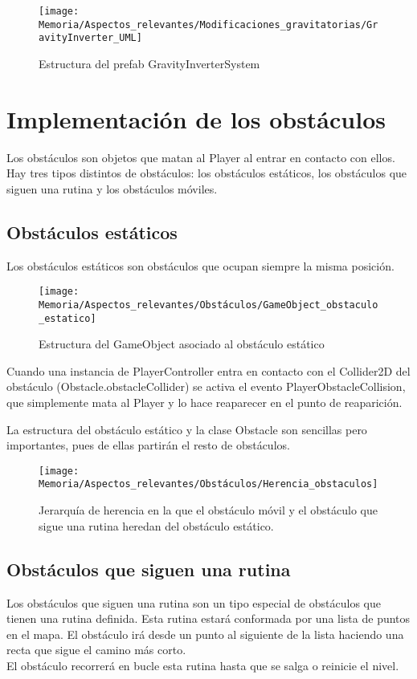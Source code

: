 \begin{figure}[h]
\centering
\texttt{[image: Memoria/Aspectos\_relevantes/Modificaciones\_gravitatorias/GravityInverter\_UML]}
\caption{Estructura del prefab GravityInverterSystem}
\end{figure}

\section{Implementación de los obstáculos}
Los obstáculos son objetos que matan al Player al entrar en contacto con ellos. Hay tres tipos distintos de obstáculos: los obstáculos estáticos, los obstáculos que siguen una rutina y los obstáculos móviles.

\subsection{Obstáculos estáticos}
Los obstáculos estáticos son obstáculos que ocupan siempre la misma posición.

\begin{figure}[h]
\centering
\texttt{[image: Memoria/Aspectos\_relevantes/Obstáculos/GameObject\_obstaculo\_estatico]}
\caption{Estructura del GameObject asociado al obstáculo estático}
\end{figure}

Cuando una instancia de PlayerController entra en contacto con el Collider2D del obstáculo (Obstacle.obstacleCollider) se activa el evento PlayerObstacleCollision, que simplemente mata al Player y lo hace reaparecer en el punto de reaparición.

La estructura del obstáculo estático y la clase Obstacle son sencillas pero importantes, pues de ellas partirán el resto de obstáculos.

\begin{figure}[h]
\centering
\texttt{[image: Memoria/Aspectos\_relevantes/Obstáculos/Herencia\_obstaculos]}
\caption{Jerarquía de herencia en la que el obstáculo móvil y el obstáculo que sigue una rutina heredan del obstáculo estático.}
\end{figure}

\subsection{Obstáculos que siguen una rutina}
Los obstáculos que siguen una rutina son un tipo especial de obstáculos que tienen una rutina definida. Esta rutina estará conformada por una lista de puntos en el mapa. El obstáculo irá desde un punto al siguiente de la lista haciendo una recta que sigue el camino más corto.\\
El obstáculo recorrerá en bucle esta rutina hasta que se salga o reinicie el nivel.

